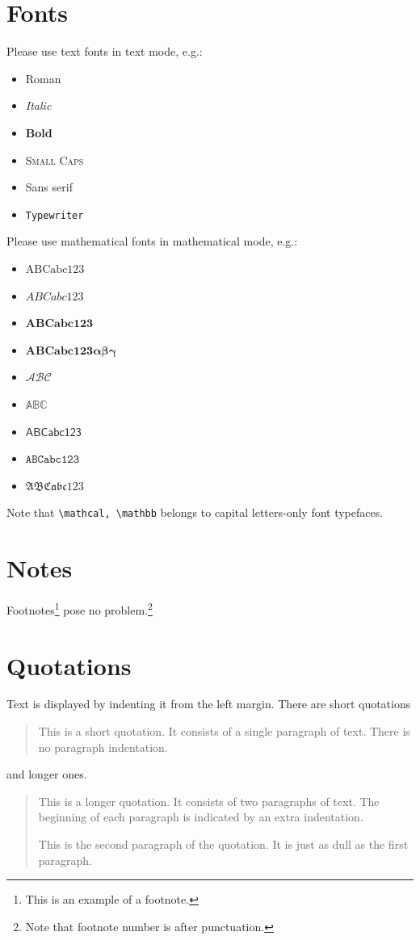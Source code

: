 \documentclass[aap]{imsart}
\theoremstyle{plain}
\theoremstyle{definition}
\begin{document}
\section{Fonts}
Please use text fonts in text mode, e.g.:
\begin{itemize}
\item[]\textrm{Roman}
\item[]\textit{Italic}
\item[]\textbf{Bold}
\item[]\textsc{Small Caps}
\item[]\textsf{Sans serif}
\item[]\texttt{Typewriter}
\end{itemize}
Please use mathematical fonts in mathematical mode, e.g.:
\begin{itemize}
\item[] $\mathrm{ABCabc123}$
\item[] $\mathit{ABCabc123}$
\item[] $\mathbf{ABCabc123}$
\item[] $\boldsymbol{ABCabc123\alpha\beta\gamma}$
\item[] $\mathcal{ABC}$
\item[] $\mathbb{ABC}$
\item[] $\mathsf{ABCabc123}$
\item[] $\mathtt{ABCabc123}$
\item[] $\mathfrak{ABCabc123}$
\end{itemize}
Note that \verb|\mathcal, \mathbb| belongs to capital letters-only font typefaces.

\section{Notes}
Footnotes\footnote{This is an example of a footnote.}
pose no problem.\footnote{Note that footnote number is after punctuation.}

\section{Quotations}

Text is displayed by indenting it from the left margin. There are short quotations
\begin{quote}
This is a short quotation.  It consists of a
single paragraph of text.  There is no paragraph
indentation.
\end{quote}
and longer ones.
\begin{quotation}
This is a longer quotation.  It consists of two paragraphs
of text.  The beginning of each paragraph is indicated
by an extra indentation.

This is the second paragraph of the quotation.  It is just
as dull as the first paragraph.
\end{quotation}
\end{document}
